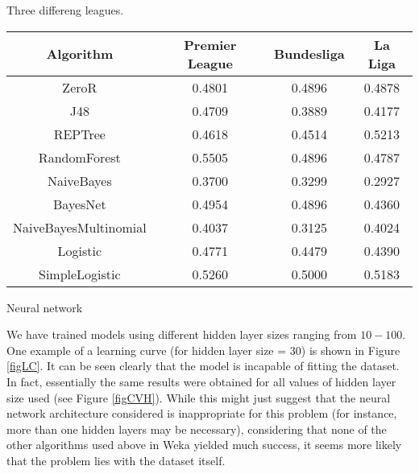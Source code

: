 \documentclass[a4paper,11pt,table]{article}
\begin{document}
Three differeng leagues.

\begin{center}
    \begin{tabular}{|c|c|c|c|}
        \hline
        Algorithm               &   Premier League  &   Bundesliga  &   La Liga \\
        \hline
        ZeroR                   &   0.4801          &   0.4896      &   0.4878 \\
        \hline
        J48                     &   0.4709          &   0.3889      &   0.4177 \\
        \hline
        REPTree                 &   0.4618          &   0.4514      &   0.5213 \\
        \hline
        RandomForest            &   \cellcolor{red!25}0.5505          &   0.4896      &   0.4787 \\
        \hline
        NaiveBayes              &   0.3700          &   0.3299      &   0.2927 \\
        \hline
        BayesNet                &   0.4954          &   0.4896      &   0.4360 \\
        \hline
        NaiveBayesMultinomial   &   0.4037          &   0.3125      &   0.4024 \\
        \hline
        Logistic                &   0.4771          &   0.4479      &   0.4390 \\
        \hline
        SimpleLogistic          &   0.5260          &   \cellcolor{red!25}0.5000      &   \cellcolor{red!25}0.5183 \\
        \hline
    \end{tabular}
\end{center}

Neural network

We have trained models using different hidden layer sizes ranging from $10-100$. One example of a learning curve (for hidden layer size = 30) is shown in Figure \ref{figLC}. It can be seen clearly that the model is incapable of fitting the dataset. In fact, essentially the same results were obtained for all values of hidden layer size used (see Figure \ref{figCVH}). While this might just suggest that the neural network architecture considered is inappropriate for this problem (for instance, more than one hidden layers may be necessary), considering that none of the other algorithms used above in Weka yielded much success, it seems more likely that the problem lies with the dataset itself.
\end{document}
